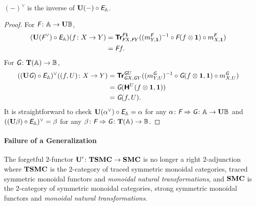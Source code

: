 \begin{proposition}
  $(-)^{\vee}$ is the inverse of $\mathbf{U}(-) \circ \textit{\textsf{E}}_{\mathbb{A}}$.
\end{proposition}
\begin{proof}
  For $\textit{\textsf{F}} \colon \mathbb{A} \to \mathbf{U}\mathbb{B}$,
  \begin{align*}
    (\mathbf{U} (\textit{\textsf{F}}^{\vee}) \circ \textit{\textsf{E}}_{\mathbb{A}})(f \colon X \to Y)
    &= {\normalfont\textsf{\textbf{Tr}}}^{\textit{\textsf{F}}\mathbf 1}_{\textit{\textsf{F}}X,\textit{\textsf{F}}Y} ((m^{\textit{\textsf{F}}}_{Y,\mathbf 1})^{-1} \circ
    \textit{\textsf{F}}(f \otimes \mathbf 1) \circ m^{\textit{\textsf{F}}}_{X,\mathbf 1}) \\
    &= \textit{\textsf{F}}f.
  \end{align*}
  For $\textit{\textsf{G}} \colon \mathbf T(\mathbb{A}) \to \mathbb{B}$,
  \begin{align*}
    ((\mathbf{U} \textit{\textsf{G}}) \circ \textit{\textsf{E}}_{\mathbb{A}})^{\vee}((f,U) \colon X \to Y)
    &= {\normalfont\textsf{\textbf{Tr}}}^{\textit{\textsf{G}}U}_{\textit{\textsf{G}}X,\textit{\textsf{G}}Y}((m^{\textit{\textsf{G}}}_{Y,U})^{-1}
    \circ \textit{\textsf{G}}(f \otimes \mathbf 1,\mathbf 1) \circ m^{\textit{\textsf{G}}}_{X,U}) \\
    &= \textit{\textsf{G}}({\normalfont\textsf{\textbf{H}}^{U}}(f \otimes \mathbf 1,\mathbf 1)) \\
    &= \textit{\textsf{G}}(f,U).
  \end{align*}
  It is straightforward to check
  $\mathbf{U} (\alpha^{\vee}) \circ \textit{\textsf{E}}_{\mathbb{A}} = \alpha$ for any $\alpha
  \colon \textit{\textsf{F}} \Rightarrow \textit{\textsf{G}} \colon \mathbb{A} \to
  \mathbf{U}\mathbb{B}$ and $((\mathbf{U} \beta) \circ \textit{\textsf{E}}_{\mathbb{A}})^{\vee} = \beta$ for
  any $\beta \colon \textit{\textsf{F}} \Rightarrow \textit{\textsf{G}} \colon \mathbf T(\mathbb{A}) \to \mathbb{B}$.
\end{proof}

\paragraph{Failure of a Generalization}

The forgetful $2$-functor $\mathbf{U}' \colon \mathbf{TSMC} \to \mathbf{SMC}$ is no longer
a right $2$-adjunction where $\mathbf{TSMC}$ is the $2$-category of traced
symmetric monoidal categories, traced symmetric monoidal functors and
\emph{monoidal natural transformations}, and $\mathbf{SMC}$ is the
$2$-category of symmetric monoidal categories, strong symmetric
monoidal functors and \emph{monoidal natural transformations}.

